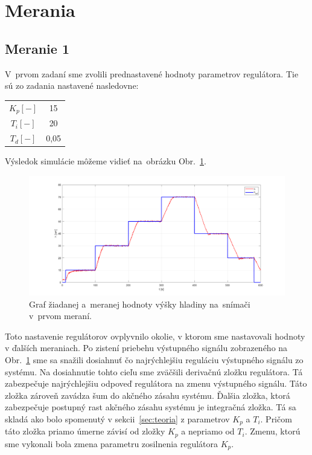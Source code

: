 \documentclass{article}
\begin{document}
\newpage

\section{Merania}
\label{sec:merania}

\subsection{Meranie 1}
\label{sec:meranie1}

V~prvom zadaní sme zvolili prednastavené hodnoty parametrov regulátora. Tie sú zo zadania nastavené nasledovne:

\begin{center}
\begin{tabular}{ |c|c| }
 \hline
 $K_p [-]$ & 15 \\
 $T_i [-]$ & 20 \\
 $T_d [-]$ & 0,05 \\
 \hline
\end{tabular}
\end{center}

Výsledok simulácie môžeme vidieť na~obrázku Obr.~\ref{fig:m1}.

\begin{figure}[!htbp]
	\begin{center}
		\includegraphics[width=\textwidth]{./include/meranie1.png}
	\end{center}
	\caption{Graf žiadanej a~meranej hodnoty výšky hladiny na~snímači v~prvom meraní.}
	\label{fig:m1}
\end{figure}


Toto nastavenie regulátorov ovplyvnilo okolie, v ktorom sme nastavovali hodnoty v ďalších meraniach. Po zistení
priebehu výstupného signálu zobrazeného na Obr.~\ref{fig:m1} sme sa snažili dosiahnuť čo najrýchlejšiu reguláciu
výstupného signálu zo systému. Na dosiahnutie tohto cieľu sme zväčšili derivačnú zložku regulátora.
Tá zabezpečuje najrýchlejšiu odpoveď regulátora na zmenu výstupného signálu. Táto zložka zároveň zavádza šum
do akčného zásahu systému. Ďalšia zložka, ktorá zabezpečuje postupný rast akčného zásahu systému je integračná
zložka. Tá sa skladá ako bolo spomenutý v sekcii~\ref{sec:teoria} z parametrov $K_p$ a $T_i$. Pričom táto zložka
priamo úmerne závisí od zložky $K_p$ a nepriamo od $T_i$. Zmenu, ktorú sme vykonali bola zmena parametru
zosilnenia regulátora $K_p$.
\end{document}
